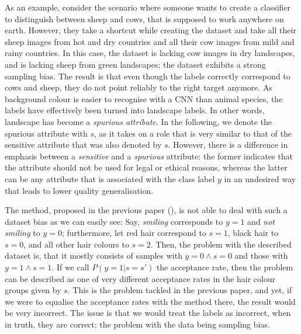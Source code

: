 As an example, consider the scenario where someone wants to create a classifier
to distinguish between sheep and cows, that is supposed to work anywhere on earth.
However, they take a shortcut while creating the dataset
and take all their sheep images from hot and dry countries
and all their cow images from mild and rainy countries.
In this case, the dataset is lacking cow images in dry landscapes,
and is lacking sheep from green landscapes;
the dataset exhibits a strong sampling bias.
The result is that even though the labels correctly correspond to cows and sheep,
they do not point reliably to the right target anymore.
As background colour is easier to recognise with a \ac{CNN} than animal species,
the labels have effectively been turned into landscape labels.
In other words, landscape has become a \emph{spurious attribute}.
%
In the following, we denote the spurious attribute with \(s\),
as it takes on a role that is very similar to that of the sensitive attribute that was also denoted by \(s\).
However, there is a difference in emphasis between a \emph{sensitive} and a \emph{spurious} attribute:
the former indicates that the attribute should not be used for legal or ethical reasons,
whereas the latter can be any attribute that is associated with the class label \(y\) in an undesired way
that leads to lower quality generalisation.

The method, proposed in the previous paper (),
is not able to deal with such a dataset bias as we can easily see:
Say, \emph{smiling} corresponds to \(y=1\) and \emph{not smiling} to \(y=0\);
furthermore, let red hair correspond to \(s=1\), black hair to \(s=0\), and all other hair colours to \(s=2\).
Then, the problem with the described dataset is, that it mostly consists of samples with \(y=0\wedge s=0\)
and those with \(y=1\wedge s=1\).
If we call \(P(y=1|s=s')\) the acceptance rate,
then the problem can be described as one of very different acceptance rates in the hair colour groups given by \(s\).
This is the problem tackled in the previous paper,
and yet, if we were to equalise the acceptance rates with the method there,
the result would be very incorrect.
The issue is that we would treat the labels as incorrect, when in truth, they are correct;
the problem with the data being sampling bias.

